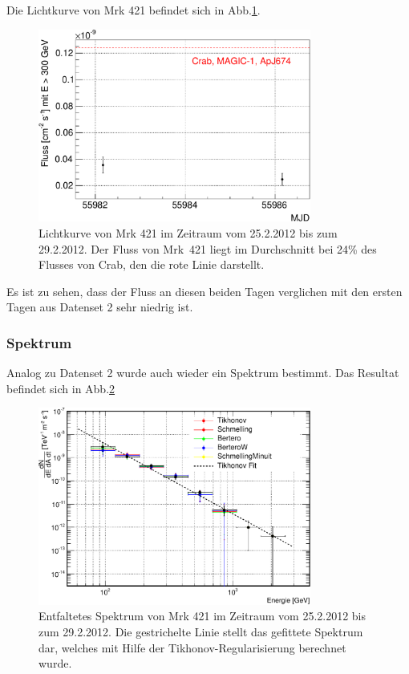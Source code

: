 Die Lichtkurve von Mrk 421 befindet sich in Abb.\ref{Datenset1_LC_Mrk421}.

\begin{figure}
    \centering
    \includegraphics[width=0.8\textwidth]{./Plots/04_MrkAnalyse/Datenset1/Datenset1_LC_Mrk421.pdf}
    \caption{Lichtkurve von Mrk 421 im Zeitraum vom 25.2.2012 bis zum 29.2.2012.
    Der Fluss von Mrk~421 liegt im Durchschnitt bei 24\% des Flusses von Crab, den die rote Linie darstellt.}
    \label{Datenset1_LC_Mrk421}
\end{figure}

Es ist zu sehen, dass der Fluss an diesen beiden Tagen verglichen mit den ersten Tagen aus Datenset 2 sehr niedrig ist.



\FloatBarrier

\subsubsection{Spektrum}
Analog zu Datenset 2 wurde auch wieder ein Spektrum bestimmt.
Das Resultat befindet sich in Abb.\ref{Datenset1_Spektrum_Mrk421}

\begin{figure}
    \centering
    \includegraphics[width=0.8\textwidth]{./Plots/04_MrkAnalyse/Datenset1/Spektrum_Mrk421.pdf}
    \caption{Entfaltetes Spektrum von Mrk 421 im Zeitraum vom 25.2.2012 bis zum 29.2.2012.
    Die gestrichelte Linie stellt das gefittete Spektrum dar, welches mit Hilfe der Tikhonov-Regularisierung berechnet wurde.}
    \label{Datenset1_Spektrum_Mrk421}
\end{figure}

